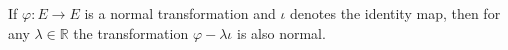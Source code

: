 If $\varphi: E \rightarrow E$ is a normal transformation and $\iota$ denotes the identity map, then for any $\lambda \in \mathbb{R}$ the transformation $\varphi - \lambda \iota$ is also normal.
